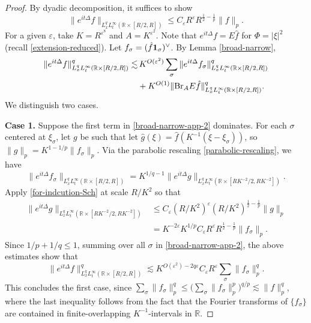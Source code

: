 \documentclass{amsart}
\numberwithin{equation}{section}
\newcommand{\De}{\Delta}
\newcommand{\e}{\varepsilon}
\newcommand{\si}{\sigma}
\newcommand{\ZR}{\mathbb{R}}
\newcommand{\Id}{{\bf 1}}
\newcommand{\BR}{{\rm{Br}}}
\begin{document}
\begin{proof}
By dyadic decomposition, it suffices to show  
\begin{equation}
\label{for-indcution-Sch}
    \|e^{it\De}f\|_{L^q_xL^\infty_t(\ZR\times[R/2,R])}\leq C_\e R^\e R^{\frac{1}{2}-\frac{1}{p}}\|f\|_{p}.
\end{equation}
For a given $\e$, take $K=R^{\e^8}$ and $A=K^{\e^2}$.
Note that $e^{it\De}f=E\hat f$ for $\Phi=|\xi|^2$ (recall \eqref{extension-reduced}).
Let $f_\si=(\hat f\Id_\si)^\vee$.
By Lemma \ref{broad-narrow},
\begin{align}
\label{broad-narrow-app-2}
    \|e^{it\De}f\|_{L^q_xL^\infty_t(\ZR\times[R/2,R])}^q\lesssim &\,K^{O(\e^2)}\sum_\si\|e^{it\De}f_\si\|_{L^q_xL^\infty_t(\ZR\times[R/2,R])}^q\\
    &+K^{O(1)}\|\BR_A E\hat f\|_{L^q_xL^\infty_t(\ZR\times[R/2,R])}^q.
\end{align}
We distinguish two cases.

\smallskip

{\bf Case 1.} Suppose the first term in \eqref{broad-narrow-app-2} dominates.
For each $\si$ centered at $\xi_\si$, let $g$ be such that let $\hat g(\xi)=\hat f(K^{-1}(\xi-\xi_\si))$, so $\|g\|_p=K^{1-1/p}\|f_\si\|_p$.
Via the parabolic rescaling \eqref{parabolic-rescaling}, we have
\begin{equation}
    \|e^{it\De}f_\si\|_{L^q_xL^\infty_t(\ZR\times[R/2,R])}=K^{1/q-1}\|e^{it\De}g\|_{L^q_xL^\infty_t(\ZR\times[RK^{-2}/2,RK^{-2}])}.
\end{equation}
Apply \eqref{for-indcution-Sch} at scale $R/K^2$ so that
\begin{align}
    \|e^{it\De}g\|_{L^q_xL^\infty_t(\ZR\times[RK^{-2}/2,RK^{-2}])}&\leq C_\e (R/K^2)^\e (R/K^2)^{\frac{1}{2}-\frac{1}{p}}\|g\|_p\\
    &= K^{-2\e}K^{1/p}C_\e R^\e R^{\frac{1}{2}-\frac{1}{p}}\|f_\si\|_p.
\end{align}
Since $1/p+1/q\leq1$, summing over all $\si$ in \eqref{broad-narrow-app-2}, the above estimates show that
\begin{equation}
    \|e^{it\De}f\|_{L^q_xL^\infty_t(\ZR\times[R/2,R])}^q\lesssim K^{O(\e^2)-2q\e}C_\e R^\e \sum_\si\|f_\si\|_p^q.
\end{equation}
This concludes the first case, since $\sum_\si\|f_\si\|_p^q\leq \big(\sum_\si\|f_\si\|_p^p\big)^{q/p}\lesssim \|f\|_p^q$, where the last inequality follows from the fact that the  Fourier transforms of $\{f_\si\}$ are contained in finite-overlapping $K^{-1}$-intervals in $\ZR$.


\end{proof}
\end{document}
